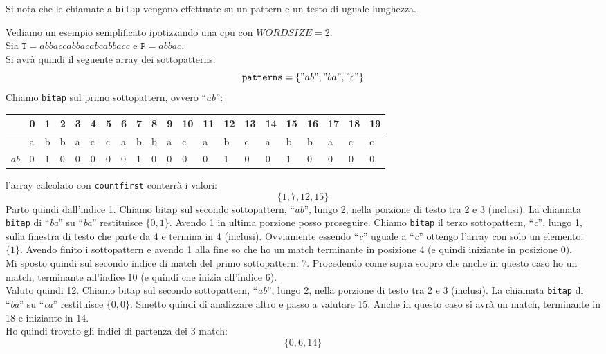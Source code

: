 \documentclass[a4paper,12pt, oneside]{article}
\begin{document}
Si nota che le chiamate a \texttt{bitap} vengono effettuate su un
pattern e un testo di uguale lunghezza.
\begin{esempio}
  Vediamo un esempio semplificato ipotizzando una cpu con
  $WORDSIZE=2$.\\
  Sia $\mathtt{T}=abbaccabbacabcabbacc$ e $\mathtt{P}=abbac$.\\
  Si avrà quindi il seguente array dei sottopatterns:
  \[\mathtt{patterns}=\{"ab", "ba", "c"\}\]
  Chiamo \texttt{bitap} sul primo sottopattern, ovvero
  ``\textit{ab}'':
  \begin{center}
    \begin{table}[H]
      \begin{tabular}{l|l|l|l|l|l|l|l|l|l|l|l|l|l|l|l|l|l|l|l|l|}
        & 0 & 1 & 2 & 3 & 4 & 5 & 6 & 7 & 8 & 9 & 10 & 11 & 12 & 13 &
                                                                      14
        & 15 & 16 & 17 & 18 & 19 \\ \hline
        & a & b & b & a & c & c & a & b & b & a & c & a & b & c & a & b &
                                                                        b
             & a & c & c \\ \hline  
        \textit{ab} & 0 & 1 & 0 & 0 & 0 & 0 & 0 & 1 & 0 & 0 & 0 & 0 & 1 & 0 & 0 & 1 &
                                                                        0
             & 0 & 0 & 0 \\ \bottomrule
      \end{tabular}
    \end{table}
  \end{center}
  l'array calcolato con \texttt{countfirst} conterrà i valori:
  \[\{1,7,12,15\}\]
  Parto quindi dall'indice 1. Chiamo bitap sul secondo sottopattern,
  ``\textit{ab}'', lungo 2, nella porzione di testo tra 2 e
  3 (inclusi). La chiamata \texttt{bitap} di ``\textit{ba}'' su ``\textit{ba}''
  restituisce $\{0,1\}$. Avendo 1 in ultima porzione posso proseguire.
  Chiamo \texttt{bitap} il terzo sottopattern, ``\textit{c}'', lungo
  1, sulla finestra di testo che parte da 4 e termina in 4 (inclusi). Ovviamente
  essendo ``\textit{c}'' uguale a ``\textit{c}'' ottengo l'array con
  solo un elemento: $\{1\}$. Avendo finito i sottopattern e avendo 1
  alla fine so che ho un match terminante in posizione 4 (e quindi
  iniziante in posizione 0). \\Mi sposto quindi sul secondo indice di
  match del primo sottopattern: 7. Procedendo come sopra scopro che
  anche in questo caso ho un match, terminante all'indice 10 (e quindi
  che inizia all'indice 6). \\Valuto quindi 12.  Chiamo bitap sul
  secondo sottopattern, ``\textit{ab}'', lungo 2, nella porzione di
  testo tra 2 e 3 (inclusi). La chiamata \texttt{bitap} di
  ``\textit{ba}'' su ``\textit{ca}''  restituisce $\{0,0\}$. Smetto
  quindi di analizzare altro e passo a valutare 15. Anche in questo
  caso si avrà un match, terminante in 18 e iniziante in 14.\\
  Ho quindi trovato gli indici di partenza dei 3 match:
  \[\{0,6,14\}\]
\end{esempio}
\end{document}
